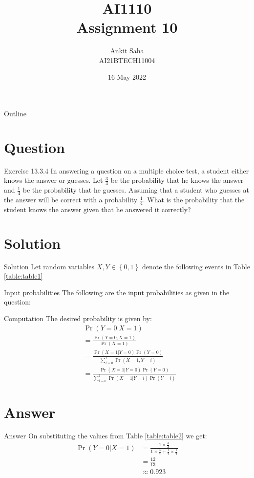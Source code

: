\documentclass{beamer}
\title{AI1110 \\ Assignment 10}
\author{Ankit Saha \\ AI21BTECH11004}
\date{16 May 2022}
\providecommand{\pr}[1]{\ensuremath{\Pr\left(#1\right)}}
\providecommand{\cbrak}[1]{\ensuremath{\left\{#1\right\}}}
\begin{document}
	\begin{frame}
		\titlepage
	\end{frame}
	
	\begin{frame}{Outline}
    		\tableofcontents
	\end{frame}
	
	\section{Question}
	\begin{frame}{Exercise 13.3.4}
	In answering a question on a multiple choice test, a student either knows the answer or guesses. Let $\frac34$ be the probability that he knows the answer and $\frac14$ be the probability that he guesses. Assuming that a student who guesses at the answer will be correct with a probability $\frac14$. What is the probability that the student knows the answer given that he answered it correctly?
	\end{frame}
	
	\section{Solution}
	\begin{frame}{Solution}
	Let random variables $X, Y \in \cbrak{0,1}$ denote the following events in Table \eqref{table:table1}
	\begin{table}[ht!]
		\centering
		
		\caption{Description of events}
		\label{table:table1}	
	\end{table}
	\end{frame}
		
	\begin{frame}{Input probabilities}
	The following are the input probabilities as given in the question:
	\begin{table}[ht!]
		\centering
		
		\caption{Input probabilities}
		\label{table:table2}	
	\end{table}
	\end{frame}

	\begin{frame}{Computation}
	The desired probability is given by:
	\begin{align}
		&\pr{Y = 0|X = 1} \\ 
		&= \frac{\pr{Y = 0,X = 1}}{\pr{X = 1}} \\
		&= \frac{\pr{X = 1|Y = 0}\pr{Y = 0}}{\sum_{i=0}^1 \pr{X = 1,Y = i}} \\
		&= \frac{\pr{X = 1|Y = 0}\pr{Y = 0}}{\sum_{i=0}^1 \pr{X = 1|Y = i}\pr{Y = i}}
	\end{align}
	\end{frame}
	
	\section{Answer}
	\begin{frame}{Answer}
	On substituting the values from Table \eqref{table:table2} we get:
	\begin{align}
		\pr{Y = 0|X = 1} &= \frac{1 \times \frac34}{1 \times \frac34 + \frac14 \times \frac14} \\
		&= \frac{12}{13} \\
		&\approx 0.923
	\end{align}
	\end{frame}
	
\end{document}
